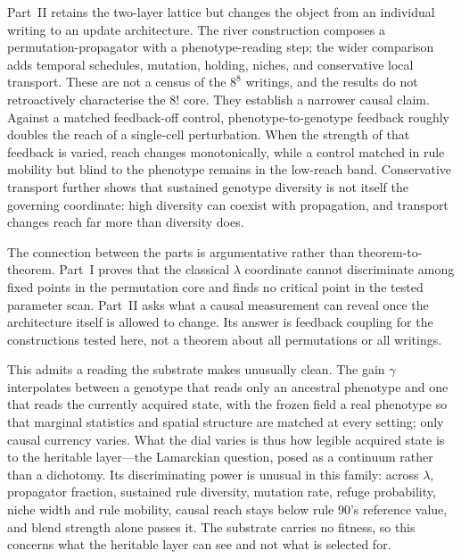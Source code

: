 \documentclass[man,12pt,floatsintext,donotrepeattitle]{apa7}
\begin{document}
Part~II retains the two-layer lattice but changes the object from an individual
writing to an update architecture. The river construction composes a
permutation-propagator with a phenotype-reading step; the wider comparison adds
temporal schedules, mutation, holding, niches, and conservative local
transport. These are not a census of the $8^8$ writings, and the results do not
retroactively characterise the $8!$ core. They establish a narrower causal
claim. Against a matched feedback-off control, phenotype-to-genotype feedback
roughly doubles the reach of a single-cell perturbation. When the strength of
that feedback is varied, reach changes monotonically, while a control matched
in rule mobility but blind to the phenotype remains in the low-reach band.
Conservative transport further shows that sustained genotype diversity is not
itself the governing coordinate: high diversity can coexist with propagation,
and transport changes reach far more than diversity does.

The connection between the parts is argumentative rather than
theorem-to-theorem. Part~I proves that the classical $\lambda$ coordinate cannot
discriminate among fixed points in the permutation core and finds no critical
point in the tested parameter scan. Part~II asks what a causal measurement can
reveal once the architecture itself is allowed to change. Its answer is
feedback coupling for the constructions tested here, not a theorem about all
permutations or all writings.

This admits a reading the substrate makes unusually clean. The gain $\gamma$
interpolates between a genotype that reads only an ancestral phenotype and one
that reads the currently acquired state, with the frozen field a real phenotype
so that marginal statistics and spatial structure are matched at every setting;
only causal currency varies. What the dial varies is thus how legible acquired
state is to the heritable layer---the Lamarckian question, posed as a continuum
rather than a dichotomy. Its discriminating power is unusual in this family:
across $\lambda$, propagator fraction, sustained rule diversity, mutation rate,
refuge probability, niche width and rule mobility, causal reach stays below rule $90$'s
reference value, and blend strength alone passes it. The substrate carries no
fitness, so this concerns what the heritable layer can see and not what is
selected for.
\end{document}
